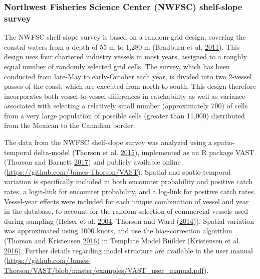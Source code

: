 \documentclass[12pt,]{article}
\begin{document}
\subsubsection{Northwest Fisheries Science Center (NWFSC) shelf-slope
survey}\label{northwest-fisheries-science-center-nwfsc-shelf-slope-survey}

The NWFSC shelf-slope survey is based on a random-grid design; covering
the coastal waters from a depth of 55 m to 1,280 m (Bradburn et al.
\protect\hyperlink{ref-bradburn_2003_2011}{2011}). This design uses four
chartered industry vessels in most years, assigned to a roughly equal
number of randomly selected grid cells. The survey, which has been
conducted from late-May to early-October each year, is divided into two
2-vessel passes of the coast, which are executed from north to south.
This design therefore incorporates both vessel-to-vessel differences in
catchability as well as variance associated with selecting a relatively
small number (approximately 700) of cells from a very large population
of possible cells (greater than 11,000) distributed from the Mexican to
the Canadian border.

The data from the NWFSC shelf-slope survey was analyzed using a
spatio-temporal delta-model (Thorson et al.
\protect\hyperlink{ref-thorson_geostatistical_2015}{2015}), implemented
as an R package VAST (Thorson and Barnett
\protect\hyperlink{ref-thorson_comparing_2017}{2017}) and publicly
available online (\url{https://github.com/James-Thorson/VAST}). Spatial
and spatio-temporal variation is specifically included in both encounter
probability and positive catch rates, a logit-link for encounter
probability, and a log-link for positive catch rates. Vessel-year
effects were included for each unique combination of vessel and year in
the database, to account for the random selection of commercial vessels
used during sampling (Helser et al.
\protect\hyperlink{ref-helser_generalized_2004}{2004}, Thorson and Ward
(\protect\hyperlink{ref-thorson_accounting_2014}{2014})). Spatial
variation was approximated using 1000 knots, and use the bias-correction
algorithm (Thorson and Kristensen
\protect\hyperlink{ref-thorson_implementing_2016}{2016}) in Template
Model Builder (Kristensen et al.
\protect\hyperlink{ref-kristensen_tmb:_2016}{2016}). Further details
regarding model structure are available in the user manual
(\url{https://github.com/James-Thorson/VAST/blob/master/examples/VAST_user_manual.pdf}).
\end{document}
